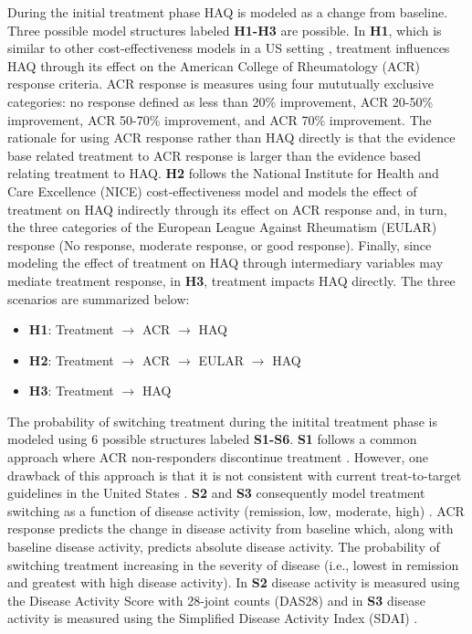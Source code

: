 \documentclass[11pt,final,fleqn]{article}\usepackage[]{graphicx}\usepackage[]{color}
\theoremstyle{plain}
\begin{document}
During the initial treatment phase HAQ is modeled as a change from baseline. Three possible model structures labeled \textbf{H1-H3} are possible. In \textbf{H1}, which is similar to other cost-effectiveness models in a US setting \citep[e.g.][]{carlson2015economic, icer2017tim}, treatment influences HAQ through its effect on the American College of Rheumatology (ACR) response criteria. ACR response is measures using four mututually exclusive categories: no response defined as less than 20\% improvement, ACR 20-50\% improvement, ACR 50-70\% improvement, and ACR 70\% improvement. The rationale for using ACR response rather than HAQ directly is that the evidence base related treatment to ACR response is larger than the evidence based relating treatment to HAQ. \textbf{H2} follows the National Institute for Health and Care Excellence (NICE) cost-effectiveness model \citep{stevenson2016adalimumab, stevenson2017cost} and models the effect of treatment on HAQ indirectly through its effect on ACR response and, in turn, the three categories of the European League Against Rheumatism (EULAR) response (No response, moderate response, or good response). Finally, since modeling the effect of treatment on HAQ through intermediary variables may mediate treatment response, in \textbf{H3}, treatment impacts HAQ directly. The three scenarios are summarized below: 

\begin{itemize}
\item \textbf{H1}: Treatment $\rightarrow$ ACR $\rightarrow$ HAQ
\item \textbf{H2}: Treatment $\rightarrow$ ACR $\rightarrow$ EULAR $\rightarrow$ HAQ
\item \textbf{H3}: Treatment $\rightarrow$ HAQ
\end{itemize}

The probability of switching treatment during the initital treatment phase is modeled using 6 possible structures labeled \textbf{S1-S6}. \textbf{S1} follows a common approach where ACR non-responders discontinue treatment \citep[e.g.][]{carlson2015economic, icer2017tim}. However, one drawback of this approach is that it is not consistent with current treat-to-target guidelines in the United States \citep{singh20162015}. \textbf{S2} and \textbf{S3} consequently model treatment switching as a function of disease activity (remission, low, moderate, high) \citep{anderson2012rheumatoid}. ACR response predicts the change in disease activity from baseline which, along with baseline disease activity, predicts absolute disease activity. The probability of switching treatment increasing in the severity of disease (i.e., lowest in remission and greatest with high disease activity). In \textbf{S2} disease activity is measured using the Disease Activity Score with 28-joint counts (DAS28) \citep{prevoo1995modified} and in \textbf{S3} disease activity is measured using the Simplified Disease Activity Index (SDAI) \citep{smolen2003simplified, aletaha2005simplified}.     
\end{document}
